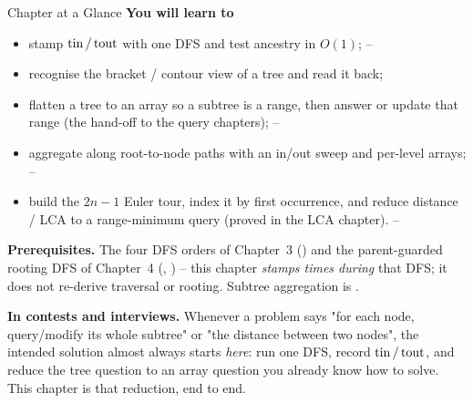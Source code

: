 \begin{chaptertheorybox}{Chapter at a Glance}
\textbf{You will learn to}
\begin{itemize}[nosep]
  \item stamp $\operatorname{tin}/\operatorname{tout}$ with one DFS and test ancestry in $O(1)$;          \hfill{}--
  \item recognise the bracket / contour view of a tree and read it back;       \hfill{}
  \item flatten a tree to an array so a subtree is a range, then answer or update
        that range (the hand-off to the query chapters);                       \hfill{}--
  \item aggregate along root-to-node paths with an in/out sweep and per-level arrays;
        \hfill{}--
  \item build the $2n{-}1$ Euler tour, index it by first occurrence, and reduce
        distance / LCA to a range-minimum query (proved in the LCA chapter).   \hfill{}--
\end{itemize}

\textbf{Prerequisites.} The four DFS orders of Chapter~3 () and the
parent-guarded rooting DFS of Chapter~4 (, ) -- this
chapter \emph{stamps times during} that DFS; it does not re-derive traversal or rooting.
Subtree aggregation is .

\textbf{In contests and interviews.} Whenever a problem says "for each node, query/modify
its whole subtree" or "the distance between two nodes", the intended solution almost always
starts \emph{here}: run one DFS, record $\operatorname{tin}/\operatorname{tout}$, and reduce the tree question to an
array question you already know how to solve. This chapter is that reduction, end to end.
\end{chaptertheorybox}

